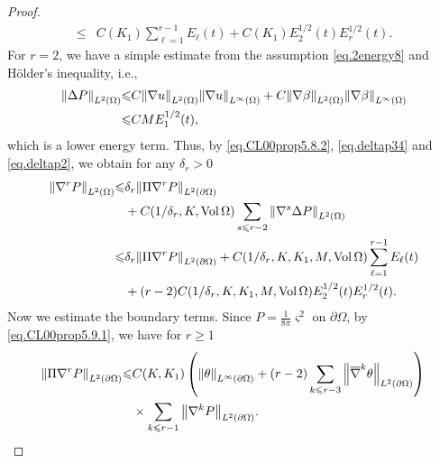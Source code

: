 \documentclass[12pt,reqno]{amsart}
\numberwithin{equation}{section}
\theoremstyle{definition}
\theoremstyle{remark}
\begin{document}
\begin{proof}
\begin{align}
  {\leqslant}&C(K_1)\sum_{\ell=1}^{r-1} E_\ell(t)+C(K_1)E_2^{1/2}(t)E_r^{1/2}(t).
\end{align}
For $r=2$, we have a simple estimate from the assumption \eqref{eq.2energy8} and H\"older's inequality, i.e.,
\begin{align}\label{eq.deltap2}
  {\left\Vert{\Delta{P }}\right\Vert}_{L^2(\Omega)}{\leqslant}&C{\left\Vert{{\nabla} u}\right\Vert}_{L^2(\Omega)}{\left\Vert{{\nabla} u}\right\Vert}_{L^\infty(\Omega)}+C{\left\Vert{{\nabla} \beta}\right\Vert}_{L^2(\Omega)}{\left\Vert{{\nabla} \beta}\right\Vert}_{L^\infty(\Omega)}{\nonumber}\\
  {\leqslant}& CME_1^{1/2}(t),
\end{align}
which is a lower energy term.
Thus, by \eqref{eq.CL00prop5.8.2}, \eqref{eq.deltap34} and \eqref{eq.deltap2}, we obtain for any $\delta_r>0$
\begin{align}\label{eq.est.nbrp}
{\left\Vert{{\nabla}^r {P }}\right\Vert}_{L^2(\Omega)}
  {\leqslant} &\delta_r{\left\Vert{\Pi {\nabla}^r {P }}\right\Vert}_{L^2({\partial}\Omega)}{\nonumber}\\
  &+C(1/\delta_r,K,{\mathrm{Vol}\,}\Omega)\sum_{s{\leqslant} r-2}{\left\Vert{{\nabla}^s\Delta {P }}\right\Vert}_{L^2(\Omega)}{\nonumber}\\
  {\leqslant}&\delta_r{\left\Vert{\Pi {\nabla}^r {P }}\right\Vert}_{L^2({\partial}\Omega)}+C(1/\delta_r,K,K_1,M,{\mathrm{Vol}\,}\Omega)\sum_{\ell=1}^{r-1} E_\ell(t){\nonumber}\\
  &+(r-2)C(1/\delta_r,K,K_1,M,{\mathrm{Vol}\,}\Omega)E_2^{1/2}(t)E_r^{1/2}(t).
\end{align}
Now we estimate the boundary terms. Since ${P }=\frac{1}{8\pi}{\varsigma}^2$ on ${\partial}\Omega$, by \eqref{eq.CL00prop5.9.1}, we have for $r{\geqslant} 1$
\begin{align}\label{eq.pinbrp}
    {\left\Vert{\Pi{\nabla}^r {P }}\right\Vert}_{L^2({\partial}\Omega)}{\leqslant} & C(K,K_1)\left({\left\Vert{\theta}\right\Vert}_{L^\infty({\partial}\Omega)}+(r-2)\sum_{k{\leqslant} r-3} {\left\Vert{{\overline{\nabla}}^k \theta}\right\Vert}_{L^2({\partial}\Omega)}\right){\nonumber} \\
    &\times\sum_{k{\leqslant} r-1}{\left\Vert{{\nabla}^k {P }}\right\Vert}_{L^2({\partial}\Omega)}.
  \end{align}


\end{proof}
\end{document}
